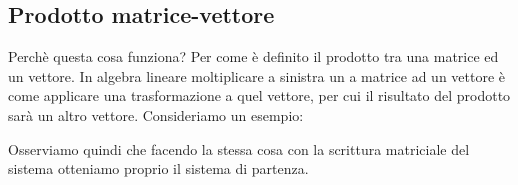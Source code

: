 \documentclass{article}     %
\begin{document}
\subsection{Prodotto matrice-vettore}
Perchè questa cosa funziona? Per come è definito il prodotto tra una matrice ed un vettore. In algebra lineare moltiplicare a sinistra un a matrice ad un vettore è come applicare una trasformazione a quel vettore, per cui il risultato del prodotto sarà un altro vettore. Consideriamo un esempio:
\begin{ex}
    [Calcolare \[\begin{pmatrix} 1 & 2 & 1\\0 & - 1 & 1\\ 2 & -1 & 0\end{pmatrix} \begin{pmatrix} 1\\2\\- 1 \end{pmatrix} \]]
    \grid[5.9cm]{}
\end{ex}
Osserviamo quindi che facendo la stessa cosa con la scrittura matriciale del sistema otteniamo proprio il sistema di partenza.
\end{document}
